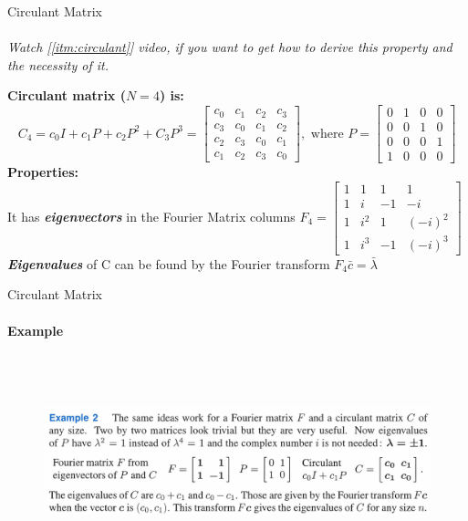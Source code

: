 \documentclass[aspectratio=169]{beamer}
\begin{document}
\begin{frame}[t]{Circulant Matrix}
\framesubtitle{}
\textit{Watch [\ref{itm:circulant}] video, if you want to get how to derive this property and the necessity of it. }

\textbf{Circulant matrix ($N=4$) is:}
\begin{equation*}
    C_4 = c_0I+ c_1P + c_2P^2 + C_3P^3 = \begin{bmatrix}
    c_0 & c_1 & c_2 & c_3\\
    c_3 & c_0 & c_1 & c_2 \\ 
    c_2 & c_3  & c_0 & c_1 \\
    c_1 & c_2  & c_3 & c_0 
    \end{bmatrix}, \text{ where } P = \begin{bmatrix}
    0 & 1 & 0 & 0\\
    0 & 0 & 1 & 0 \\ 
    0 & 0  & 0 & 1 \\
    1 & 0  & 0 & 0 
    \end{bmatrix}
\end{equation*}
\textbf{Properties:} \\ 
It has \textbf{\textit{eigenvectors}} in the Fourier Matrix columns $F_4 = \begin{bmatrix}
1 & 1 & 1 & 1\\
1 & i & -1 & -i \\ 
1 & i^2  & 1 & (-i)^2 \\
1 & i^3  & -1 & (-i)^3 
\end{bmatrix}$ \\

\textit{\textbf{Eigenvalues}} of C can be found by the Fourier transform $F_4\bar{c} = \bar{\lambda}$
\end{frame}

\begin{frame}[t]{Circulant Matrix}
\framesubtitle{Example}
    \begin{figure}[H]
        \centering\includegraphics[height=6cm,width=1\textwidth,keepaspectratio]{circ_22.png}
        \label{fig:circ_22.png}
    \end{figure}
\end{frame}
\end{document}

